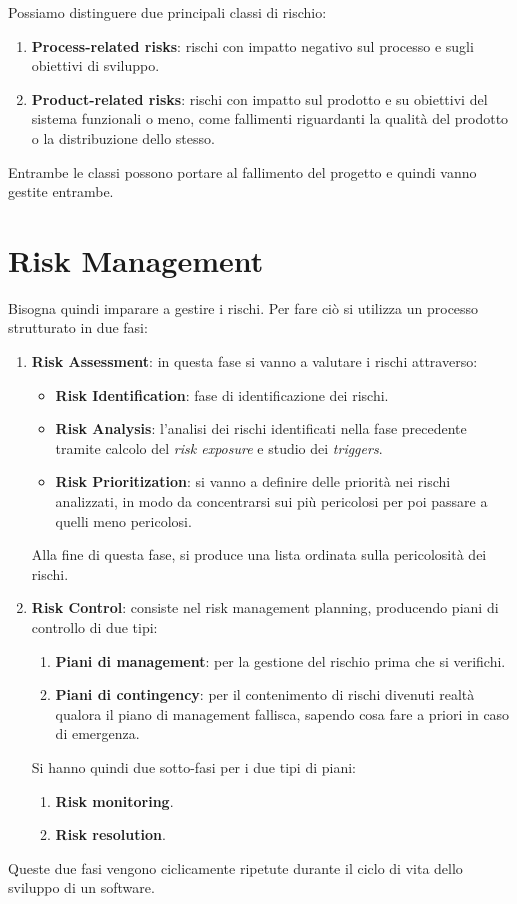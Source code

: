 Possiamo distinguere due principali classi di rischio:
\begin{enumerate}
    \item \textbf{Process-related risks}: rischi con impatto negativo sul processo
          e sugli obiettivi di sviluppo.
    \item \textbf{Product-related risks}: rischi con impatto sul prodotto e su
          obiettivi del sistema funzionali o meno, come fallimenti riguardanti
          la qualità del prodotto o la distribuzione dello stesso.
\end{enumerate}
Entrambe le classi possono portare al fallimento del progetto e quindi vanno
gestite entrambe.
\section{Risk Management}
Bisogna quindi imparare a gestire i rischi. Per fare ciò si utilizza un processo
strutturato in due fasi:
\begin{enumerate}
    \item \textbf{Risk Assessment}: in questa fase si vanno a valutare i rischi
          attraverso:
          \begin{itemize}
              \item \textbf{Risk Identification}: fase di identificazione dei
                    rischi.
              \item \textbf{Risk Analysis}: l'analisi dei rischi identificati
                    nella fase precedente tramite calcolo del \textit{risk
                        exposure} e studio dei \textit{triggers}.
              \item \textbf{Risk Prioritization}: si vanno a definire delle
                    priorità nei rischi analizzati, in modo da concentrarsi sui
                    più pericolosi per poi passare a quelli meno pericolosi.
          \end{itemize}
          Alla fine di questa fase, si produce una lista ordinata sulla pericolosità
          dei rischi.
    \item \textbf{Risk Control}: consiste nel risk management planning, producendo
          piani di controllo di due tipi:
          \begin{enumerate}
              \item \textbf{Piani di management}: per la gestione del rischio
                    prima che si verifichi.
              \item \textbf{Piani di contingency}: per il contenimento di rischi
                    divenuti realtà qualora il piano di management fallisca,
                    sapendo cosa fare a priori in caso di emergenza.
          \end{enumerate}
          Si hanno quindi due sotto-fasi per i due tipi di piani:
          \begin{enumerate}
              \item \textbf{Risk monitoring}.
              \item \textbf{Risk resolution}.
          \end{enumerate}
\end{enumerate}
Queste due fasi vengono ciclicamente ripetute durante il ciclo di vita dello
sviluppo di un software.
